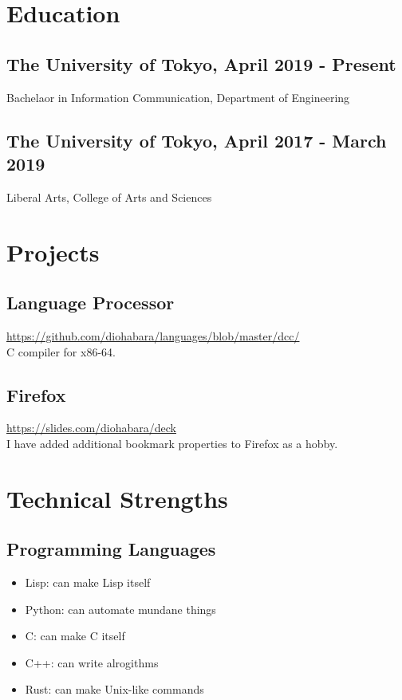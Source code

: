 \documentclass{article}
\author{Kadoi Takemaru}
\begin{document}
\section*{Education}
    \subsection*{The University of Tokyo, April 2019 - Present}
        Bachelaor in Information Communication, Department of Engineering
    \subsection*{The University of Tokyo, April 2017 - March 2019}
        Liberal Arts, College of Arts and Sciences

\section*{Projects}
    \subsection*{Language Processor}
        \url{https://github.com/diohabara/languages/blob/master/dcc/}
        \\ C compiler for x86-64.

    \subsection*{Firefox}
        \url{https://slides.com/diohabara/deck}
        \\ I have added additional bookmark properties to Firefox as a hobby.

\section*{Technical Strengths}
    \subsection*{Programming Languages}
        \begin{itemize}
            \item Lisp: can make Lisp itself
            \item Python: can automate mundane things
            \item C: can make C itself
            \item C++: can write alrogithms
            \item Rust: can make Unix-like commands
        \end{itemize}
\end{document}
